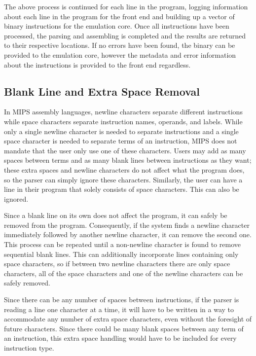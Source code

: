 \documentclass[
    paper=letter,
    parskip=half,
    fontsize=12pt,
    titlepage=firstiscover,
    toc=bibliography,
    numbers=endperiod
]{scrartcl}
\begin{document}
The above process is continued for each line in the program, logging
information about each line in the program for the front end and
building up a vector of binary instructions for the emulation core. Once
all instructions have been processed, the parsing and assembling is
completed and the results are returned to their respective locations. If
no errors have been found, the binary can be provided to the emulation
core, however the metadata and error information about the instructions
is provided to the front end regardless.

\subsection{Blank Line and Extra Space Removal}

In MIPS assembly languages, newline characters separate different
instructions while space characters separate instruction names,
operands, and labels. While only a single newline character is needed to
separate instructions and a single space character is needed to separate
terms of an instruction, MIPS does not mandate that the user only use
one of these characters. Users may add as many spaces between terms and
as many blank lines between instructions as they want; these extra
spaces and newline characters do not affect what the program does, so
the parser can simply ignore these characters. Similarly, the user can
have a line in their program that solely consists of space characters.
This can also be ignored.

Since a blank line on its own does not affect the program, it can safely
be removed from the program. Consequently, if the system finds a newline
character immediately followed by another newline character, it can
remove the second one. This process can be repeated until a non-newline
character is found to remove sequential blank lines. This can
additionally incorporate lines containing only space characters, so if
between two newline characters there are only space characters, all of
the space characters and one of the newline characters can be safely
removed.

Since there can be any number of spaces between instructions, if the
parser is reading a line one character at a time, it will have to be
written in a way to accommodate any number of extra space characters,
even without the foresight of future characters. Since there could be
many blank spaces between any term of an instruction, this extra space
handling would have to be included for every instruction type.
\end{document}
